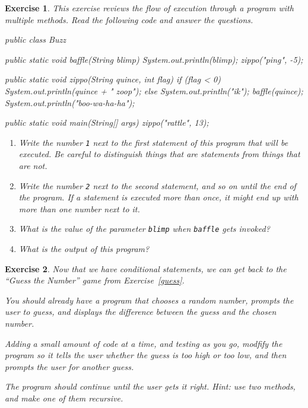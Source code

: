\documentclass[12pt]{book}
\theoremstyle{exercise}
\newtheorem{exercise}{Exercise}[chapter]
\newcommand{\java}[1]{\verb"#1"}
\newcommand{\java}[1]{\lstinline{#1}} %
\begin{document}
\begin{exercise}

This exercise reviews the flow of execution through a program with multiple methods.
Read the following code and answer the questions.

\begin{code}
public class Buzz {

    public static void baffle(String blimp) {
        System.out.println(blimp);
        zippo("ping", -5);
    }

    public static void zippo(String quince, int flag) {
        if (flag < 0) {
            System.out.println(quince + " zoop");
        } else {
            System.out.println("ik");
            baffle(quince);
            System.out.println("boo-wa-ha-ha");
        }
    }

    public static void main(String[] args) {
        zippo("rattle", 13);
    }

}
\end{code}

\begin{enumerate}

\item Write the number {\tt 1} next to the first {\em statement} of this program that will be executed.
Be careful to distinguish things that are statements from things that are not.

\item Write the number {\tt 2} next to the second statement, and so on until the end of the program.
If a statement is executed more than once, it might end up with more than one number next to it.

\item What is the value of the parameter \java{blimp} when \java{baffle} gets invoked?

\item What is the output of this program?

\end{enumerate}

\end{exercise}


\begin{exercise}

Now that we have conditional statements, we can get back to the ``Guess the Number'' game from Exercise~\ref{guess}.

You should already have a program that chooses a random number, prompts the user to guess, and displays the difference between the guess and the chosen number.

Adding a small amount of code at a time, and testing as you go, modfify the program so it tells the user whether the guess is too high or too low, and then prompts the user for another guess.

The program should continue until the user gets it right.
Hint: use two methods, and make one of them recursive.

\end{exercise}
\end{document}
